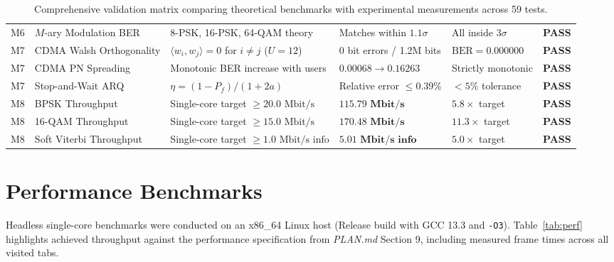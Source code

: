 \documentclass[10pt,twocolumn]{article}
\begin{document}
\begin{table}[t]
\begin{tabular}{@{}lllllc@{}}
M6 & $M$-ary Modulation BER & 8-PSK, 16-PSK, 64-QAM theory & Matches within $1.1\sigma$ & All inside $3\sigma$ & \textbf{PASS} \\
M7 & CDMA Walsh Orthogonality& $\langle w_i, w_j \rangle = 0$ for $i \ne j$ ($U=12$) & 0 bit errors / 1.2M bits & $\text{BER} = 0.000000$ & \textbf{PASS} \\
M7 & CDMA PN Spreading & Monotonic BER increase with users & $0.00068 \to 0.16263$ & Strictly monotonic & \textbf{PASS} \\
M7 & Stop-and-Wait ARQ & $\eta = (1 - P_f)/(1 + 2a)$ & Relative error $\le 0.39\%$ & $< 5\%$ tolerance & \textbf{PASS} \\
M8 & BPSK Throughput & Single-core target $\ge 20.0\text{ Mbit/s}$ & $\mathbf{115.79\text{ Mbit/s}}$ & $\mathbf{5.8\times}$ target & \textbf{PASS} \\
M8 & 16-QAM Throughput & Single-core target $\ge 15.0\text{ Mbit/s}$ & $\mathbf{170.48\text{ Mbit/s}}$ & $\mathbf{11.3\times}$ target & \textbf{PASS} \\
M8 & Soft Viterbi Throughput & Single-core target $\ge 1.0\text{ Mbit/s info}$ & $\mathbf{5.01\text{ Mbit/s info}}$ & $\mathbf{5.0\times}$ target & \textbf{PASS} \\
\bottomrule
\end{tabular}
\caption{Comprehensive validation matrix comparing theoretical benchmarks with experimental measurements across 59 tests.}
\label{tab:acceptance}
\end{table}

\section{Performance Benchmarks}

Headless single-core benchmarks were conducted on an x86\_64 Linux host (Release build with GCC 13.3 and \texttt{-O3}). Table~\ref{tab:perf} highlights achieved throughput against the performance specification from \textit{PLAN.md} Section 9, including measured frame times across all visited tabs.
\end{document}
